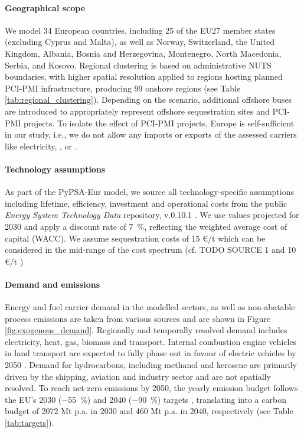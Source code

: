 \documentclass[preprint,12pt,sort&compress]{elsarticle}
\begin{document}
\paragraph{Geographical scope} 
\label{sec:geographical_scope}
We model 34 European countries, including 25 of the EU27 member states (excluding Cyprus and Malta), as well as Norway, Switzerland, the United Kingdom, Albania, Bosnia and Herzegovina, Montenegro, North Macedonia, Serbia, and Kosovo. Regional clustering is based on administrative NUTS boundaries, with higher spatial resolution applied to regions hosting planned PCI-PMI infrastructure, producing 99 onshore regions (see Table \ref{tab:regional_clustering}). Depending on the scenario, additional offshore buses are introduced to appropriately represent offshore sequestration sites and PCI-PMI projects. To isolate the effect of PCI-PMI projects, Europe is self-sufficient in our study, i.e., we do not allow any imports or exports of the assessed carriers like electricity, , or . 

\paragraph{Technology assumptions} 
\label{sec:technology_assumptions}
As part of the PyPSA-Eur model, we source all technology-specific assumptions including lifetime, efficiency, investment and operational costs from the public \textit{Energy System Technology Data} repository, v.0.10.1 \cite{zeyenPyPSATechnologydataV01012025}. We use values projected for 2030 and apply a discount rate of \SI{7}{\percent}, reflecting the weighted average cost of capital (WACC). We assume  sequestration costs of 15 \euro{}/t which can be considered in the mid-range of the cost spectrum (cf. TODO SOURCE 1 and 10 \euro{}/t \cite{hofmannH2CO2Network2025}) 

\paragraph{Demand and  emissions}
\label{sec:demand_and_co2_emissions}
Energy and fuel carrier demand in the modelled sectors, as well as non-abatable  process emissions are taken from various sources \cite{mantzosJRCIDEES20152018,eurostatCompleteEnergyBalances2022,manzGeoreferencedIndustrialSites2018,muehlenpfordtTimeSeries2019,krienOemofDemandlibV0222025} and are shown in Figure \ref{fig:exogenous_demand}. Regionally and temporally resolved demand includes electricity, heat, gas, biomass and transport. Internal combustion engine vehicles in land transport are expected to fully phase out in favour of electric vehicles by 2050 \cite{zeyenShiftingBurdensHow2025a}. Demand for hydrocarbons, including methanol and kerosene are primarily driven by the shipping, aviation and industry sector and are not spatially resolved.
To reach net-zero  emissions by 2050, the yearly emission budget follows the EU's 2030 (\SI{-55}{\percent}) and 2040 (\SI{-90}{\percent}) targets \cite{europeancommissionFit55Delivering2021, europeancommission.directorategeneralforclimateaction.IndepthReportResults2024}, translating into a carbon budget of 2072 Mt p.a. in 2030 and 460 Mt p.a. in 2040, respectively (see Table \ref{tab:targets}).
\end{document}
